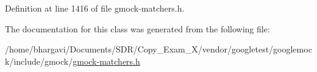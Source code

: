 Definition at line 1416 of file gmock-\/matchers.\+h.



The documentation for this class was generated from the following file\+:\begin{DoxyCompactItemize}
\item 
/home/bhargavi/\+Documents/\+S\+D\+R/\+Copy\+\_\+\+Exam\+\_\+X/vendor/googletest/googlemock/include/gmock/\hyperlink{gmock-matchers_8h}{gmock-\/matchers.\+h}\end{DoxyCompactItemize}
